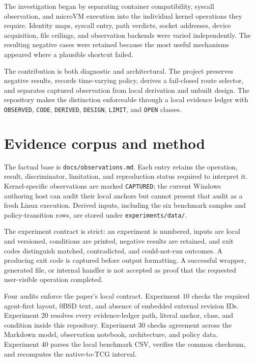 \documentclass[10pt,twocolumn]{article}
\begin{document}
The investigation began by separating container compatibility, syscall observation, and microVM execution into the individual kernel operations they require. Identity maps, syscall entry, path verdicts, socket addresses, device acquisition, file ceilings, and observation backends were varied independently. The resulting negative cases were retained because the most useful mechanisms appeared where a plausible shortcut failed.

The contribution is both diagnostic and architectural. The project preserves negative results, records time-varying policy, derives a fail-closed route selector, and separates captured observation from local derivation and unbuilt design. The repository makes the distinction enforceable through a local evidence ledger with \texttt{OBSERVED}, \texttt{CODE}, \texttt{DERIVED}, \texttt{DESIGN}, \texttt{LIMIT}, and \texttt{OPEN} classes.

\section{Evidence corpus and method}
The factual base is \texttt{docs/observations.md}. Each entry retains the operation, result, discriminator, limitation, and reproduction status required to interpret it. Kernel-specific observations are marked \texttt{CAPTURED}; the current Windows authoring host can audit their local anchors but cannot present that audit as a fresh Linux execution. Derived inputs, including the six benchmark samples and policy-transition rows, are stored under \texttt{experiments/data/}.

The experiment contract is strict: an experiment is numbered, inputs are local and versioned, conditions are printed, negative results are retained, and exit codes distinguish matched, contradicted, and could-not-run outcomes. A producing exit code is captured before output formatting. A successful wrapper, generated file, or internal handler is not accepted as proof that the requested user-visible operation completed.

Four audits enforce the paper's local contract. Experiment 10 checks the required agent-first layout, 0BSD text, and absence of embedded external revision IDs. Experiment 20 resolves every evidence-ledger path, literal anchor, class, and condition inside this repository. Experiment 30 checks agreement across the Markdown model, observation notebook, architecture, and policy data. Experiment 40 parses the local benchmark CSV, verifies the common checksum, and recomputes the native-to-TCG interval.
\end{document}
